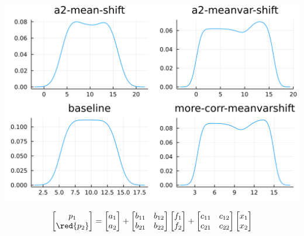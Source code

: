 \documentclass[
  ignorenonframetext,
]{beamer}
\begin{document}
\begin{frame}{}
\protect\hypertarget{section-3}{}
\begin{center}\includegraphics[width=0.95\paperheight]{complexity_files/figure-beamer/unnamed-chunk-24-1} \end{center}

\[
\begin{bmatrix}
 p_1 \\ \red{p_2}
\end{bmatrix} =
\begin{bmatrix}
 {a_1} \\ a_2
\end{bmatrix}
 + 
 \begin{bmatrix}
 b_{11} & b_{12} \\
 b_{21} & b_{22}
\end{bmatrix}
\begin{bmatrix}
 f_1 \\ f_2
\end{bmatrix}
+
 \begin{bmatrix}
 c_{11} & c_{12} \\
 c_{21} & c_{22}
\end{bmatrix}
\begin{bmatrix}
 x_1 \\ x_2
\end{bmatrix}
\]
\end{frame}
\end{document}
